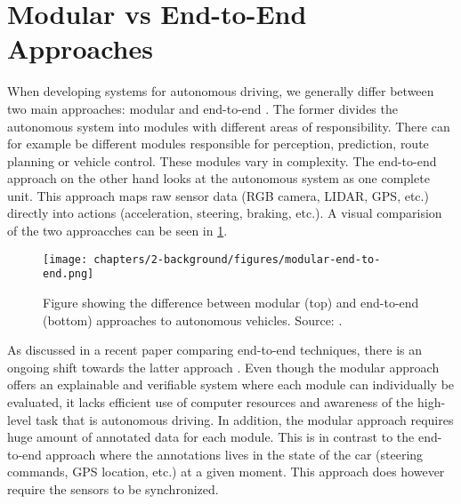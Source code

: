 \section{Modular vs End-to-End Approaches}

When developing systems for autonomous driving, we generally differ between two main approaches: modular and end-to-end \cite{multimodal-e2e-ad}. The former divides the autonomous system into modules with different areas of responsibility. There can for example be different modules responsible for perception, prediction, route planning or vehicle control. These modules vary in complexity. The end-to-end approach on the other hand looks at the autonomous system as one complete unit. This approach maps raw sensor data (RGB camera, LIDAR, GPS, etc.) directly into actions (acceleration, steering, braking, etc.). A visual comparision of the two approacches can be seen in \cref{fig:modular-vs-end-to-end}.

\begin{figure}[htbp]
    \centering
    \texttt{[image: chapters/2-background/figures/modular-end-to-end.png]}
    \caption{Figure showing the difference between modular (top) and end-to-end (bottom) approaches to autonomous vehicles. Source: \cite{computer-vision-for-autonomous-vehicles}.}
    \label{fig:modular-vs-end-to-end}
\end{figure}

As discussed in a recent paper comparing end-to-end techniques, there is an ongoing shift towards the latter approach \cite{survey-on-end-to-end-techniques}. Even though the modular approach offers an explainable and verifiable system where each module can individually be evaluated, it lacks efficient use of computer resources and awareness of the high-level task that is autonomous driving. In addition, the modular approach requires huge amount of annotated data for each module. This is in contrast to the end-to-end approach where the annotations lives in the state of the car (steering commands, GPS location, etc.) at a given moment. This approach does however require the sensors to be synchronized. 
